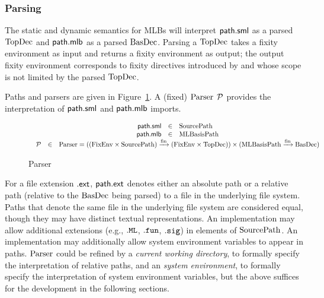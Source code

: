 \subsubsection{Parsing}
The static and dynamic semantics for MLBs will interpret
$\mathsf{path.sml}$ as a parsed $\mathrm{TopDec}$ and
$\mathsf{path.mlb}$ as a parsed $\mathrm{BasDec}$.  Parsing a $\mathrm{TopDec}$
takes a fixity environment as input and returns a fixity environment
as output; the output fixity environment corresponds to fixity
directives introduced by and whose scope is not limited by the parsed
$\mathrm{TopDec}$.

Paths and parsers are given in Figure~\ref{fig:mlb:S:PathsParser}.  A
(fixed) $\mathrm{Parser}$ $\mathcal{P}$ provides the interpretation of
$\mathsf{path.sml}$ and $\mathsf{path.mlb}$ imports.
\begin{figure}[h]
\begin{displaymath}
\begin{array}{c}
\begin{array}{rcl}
\mathsf{path.sml} & \in & \mathrm{SourcePath} \\
\mathsf{path.mlb} & \in & \mathrm{MLBasisPath} 
\end{array} \\
\begin{array}{rcl}
\mathcal{P} & \in & \mathrm{Parser} = 
((\mathrm{FixEnv} \times \mathrm{SourcePath})
 \xrightarrow{\mathrm{fin}} (\mathrm{FixEnv} \times \mathrm{TopDec})) 
\times 
(\mathrm{MLBasisPath} \xrightarrow{\mathrm{fin}} \mathrm{BasDec}) 
\end{array}
\end{array}
\end{displaymath}
\caption{Parser}\label{fig:mlb:S:PathsParser}
\end{figure}
%
For a file extension $\mathsf{.ext}$, $\mathsf{path.ext}$ denotes either an
absolute path or a relative path (relative to the $\mathrm{BasDec}$ being
parsed) to a file in the underlying file system.  Paths that denote the same
file in the underlying file system are considered equal, though they may
have distinct textual representations.  An implementation
may allow additional extensions (e.g., $\mathtt{.ML}$, $\mathtt{.fun}$,
$\mathtt{.sig}$) in elements of $\mathrm{SourcePath}$.  An implementation
may additionally allow system environment variables to appear in
paths.  $\mathrm{Parser}$ could be refined by a \emph{current working
directory}, to formally specify the interpretation of relative paths,
and an \emph{system environment}, to formally specify the
interpretation of system environment variables, but the above suffices
for the development in the following sections.

